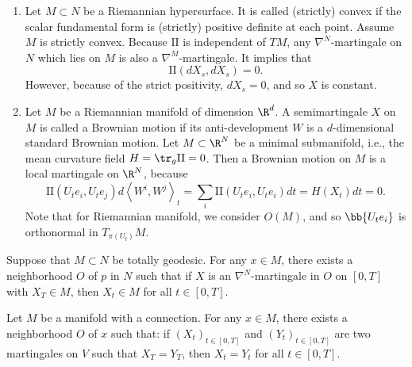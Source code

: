 \begin{exam}
    \begin{enumerate}[label=(\arabic{*})]
        \item Let $M \subset N$ be a Riemannian hypersurface. It is called (strictly) convex if the scalar fundamental form is (strictly) positive definite at each point. Assume $M$ is strictly convex. Because $\mathrm{II}$ is independent of $TM$, any $\nabla^N$-martingale on $N$ which lies on $M$ is also a $\nabla^M$-martingale. It implies that
        \begin{equation*}
            \mathrm{II}(dX_s,dX_s) = 0.
        \end{equation*}
        However, because of the strict positivity, $dX_s = 0$, and so $X$ is constant.

        \item Let $M$ be a Riemannian manifold of dimension $\R^d$. A semimartingale $X$ on $M$ is called a Brownian motion if its anti-development $W$ is a $d$-dimensional standard Brownian motion. Let $M \subset \R^N$ be a minimal submanifold, i.e., the mean curvature field $H = \tr_g \mathrm{II} = 0$. Then a Brownian motion on $M$ is a local martingale on $\R^N$, because
        \begin{equation*}
            \mathrm{II}\left(U_t e_i, U_t e_j\right) d\left\langle W^i, W^j\right\rangle_t=\sum_i\mathrm{II}\left(U_t e_i, U_t e_i\right) d t=H\left(X_t\right) d t=0.
        \end{equation*}
        Note that for Riemannian manifold, we consider $O(M)$, and so $\bb{U_te_i}$ is orthonormal in $T_{\pi(U_t)}M$.
    \end{enumerate}
\end{exam}

\begin{prop}
    Suppose that $M \subset N$ be totally geodesic. For any $x \in M$, there exists a neighborhood $O$ of $p$ in $N$ such that if $X$ is an $\nabla^N$-martingale in $O$ on $[0,T]$ with $X_T \in M$, then $X_t \in M$ for all $t \in [0,T]$.
\end{prop}

\begin{thm}
    Let $M$ be a manifold with a connection. For any $x \in M$, there exists a neighborhood $O$ of $x$ such that: if $(X_t)_{t \in [0,T]}$ and $(Y_t)_{t \in [0,T]}$ are two martingales on $V$ such that $X_T = Y_T$, then $X_t = Y_t$ for all $t \in [0,T]$.
\end{thm}

